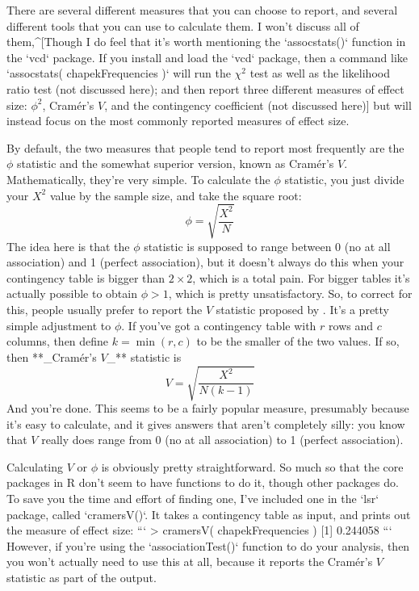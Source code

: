 There are several different measures that you can choose to report, and several different tools that you can use to calculate them. I won't discuss all of them,^[Though I do feel that it's worth mentioning the `assocstats()` function in the `vcd` package. If you install and load the `vcd` package, then a command like `assocstats( chapekFrequencies )` will run the $\chi^2$ test as well as the likelihood ratio test (not discussed here); and then report three different measures of effect size: $\phi^2$, Cram\'er's $V$, and the contingency coefficient (not discussed here)] but will instead focus on the most commonly reported measures of effect size. 

By default, the two measures that people tend to report most frequently are the $\phi$ statistic and the somewhat superior version, known as  Cram\'er's $V$. Mathematically, they're very simple. To calculate the $\phi$ statistic, you just divide your $X^2$ value by the sample size, and take the square root:
$$ 
\phi = \sqrt{\frac{X^2}{N}}
$$
The idea here is that the $\phi$ statistic is supposed to range between 0 (no at all association) and 1 (perfect association), but it doesn't always do this when your contingency table is bigger than $2 \times 2$, which is a total pain. For bigger tables it's actually possible to obtain $\phi>1$, which is pretty unsatisfactory. So, to correct for this, people usually prefer to report the $V$ statistic proposed by . It's a pretty simple adjustment to $\phi$. If you've got a contingency table with $r$ rows and $c$ columns, then define $k = \min(r,c)$ to be the smaller of the two values. If so, then **_Cram\'er's  $V$_** statistic is
$$
V = \sqrt{\frac{X^2}{N(k-1)}}
$$
And you're done. This seems to be a fairly popular measure, presumably because it's easy to calculate, and it gives answers that aren't completely silly: you know that $V$ really does range from 0 (no at all association) to 1 (perfect association). 

Calculating $V$ or $\phi$ is obviously pretty straightforward. So much so that the core packages in R don't seem to have functions to do it, though other packages do. To save you the time and effort of finding one, I've included one in the `lsr` package, called `cramersV()`. It takes a contingency table as input, and prints out the measure of effect size:
```
> cramersV( chapekFrequencies )
[1] 0.244058
```
However, if you're using the `associationTest()` function to do your analysis, then you won't actually need to use this at all, because it reports the Cram\'er's  $V$ statistic as part of the output. 



